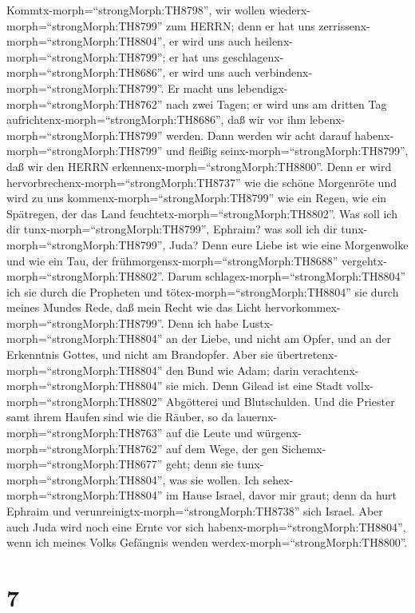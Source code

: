  Kommtx-morph=``strongMorph:TH8798'', wir wollen
wiederx-morph=``strongMorph:TH8799'' zum HERRN; denn er hat uns
zerrissenx-morph=``strongMorph:TH8804'', er wird uns auch
heilenx-morph=``strongMorph:TH8799''; er hat uns
geschlagenx-morph=``strongMorph:TH8686'', er wird uns auch
verbindenx-morph=``strongMorph:TH8799''.  Er macht uns
lebendigx-morph=``strongMorph:TH8762'' nach zwei Tagen; er wird uns am
dritten Tag aufrichtenx-morph=``strongMorph:TH8686'', daß wir vor ihm
lebenx-morph=``strongMorph:TH8799'' werden.  Dann werden wir
acht darauf habenx-morph=``strongMorph:TH8799'' und fleißig
seinx-morph=``strongMorph:TH8799'', daß wir den HERRN
erkennenx-morph=``strongMorph:TH8800''. Denn er wird
hervorbrechenx-morph=``strongMorph:TH8737'' wie die schöne Morgenröte
und wird zu uns kommenx-morph=``strongMorph:TH8799'' wie ein Regen, wie
ein Spätregen, der das Land feuchtetx-morph=``strongMorph:TH8802''.
 Was soll ich dir tunx-morph=``strongMorph:TH8799'',
Ephraim? was soll ich dir tunx-morph=``strongMorph:TH8799'', Juda? Denn
eure Liebe ist wie eine Morgenwolke und wie ein Tau, der
frühmorgensx-morph=``strongMorph:TH8688''
vergehtx-morph=``strongMorph:TH8802''.  Darum
schlagex-morph=``strongMorph:TH8804'' ich sie durch die Propheten und
tötex-morph=``strongMorph:TH8804'' sie durch meines Mundes Rede, daß
mein Recht wie das Licht hervorkommex-morph=``strongMorph:TH8799''.
 Denn ich habe Lustx-morph=``strongMorph:TH8804'' an der
Liebe, und nicht am Opfer, und an der Erkenntnis Gottes, und nicht am
Brandopfer.  Aber sie
übertretenx-morph=``strongMorph:TH8804'' den Bund wie Adam; darin
verachtenx-morph=``strongMorph:TH8804'' sie mich.  Denn
Gilead ist eine Stadt vollx-morph=``strongMorph:TH8802'' Abgötterei und
Blutschulden.  Und die Priester samt ihrem Haufen sind wie
die Räuber, so da lauernx-morph=``strongMorph:TH8763'' auf die Leute und
würgenx-morph=``strongMorph:TH8762'' auf dem Wege, der gen
Sichemx-morph=``strongMorph:TH8677'' geht; denn sie
tunx-morph=``strongMorph:TH8804'', was sie wollen.  Ich
sehex-morph=``strongMorph:TH8804'' im Hause Israel, davor mir graut;
denn da hurt Ephraim und verunreinigtx-morph=``strongMorph:TH8738'' sich
Israel.  Aber auch Juda wird noch eine Ernte vor sich
habenx-morph=``strongMorph:TH8804'', wenn ich meines Volks Gefängnis
wenden werdex-morph=``strongMorph:TH8800''.

\hypertarget{section-6}{%
\section{7}\label{section-6}}

